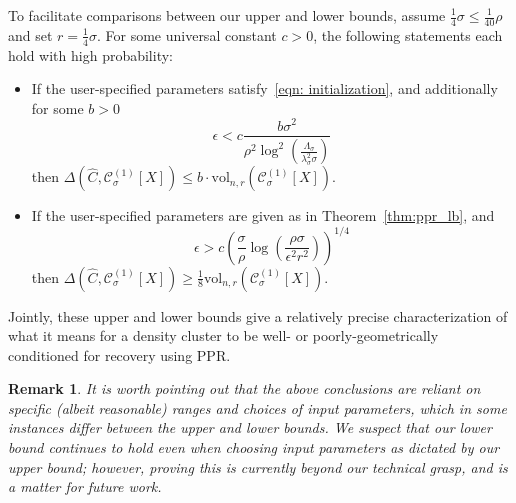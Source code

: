 \documentclass[11pt,twoside]{article}
\newtheorem*{remark}{Remark}
\newcommand{\vol}{\mathrm{vol}}
\newcommand{\1}{\mathbf{1}}
\newcommand{\Xbf}{X}             %
\newcommand{\Cset}{\mathcal{C}}
\newcommand{\Csig}{\Cset_{\sigma}}
\begin{document}
To facilitate comparisons between our upper and lower bounds, assume $\frac{1}{4}\sigma \leq \frac{1}{40}\rho$ and set $r = \frac{1}{4}\sigma$. 
For some universal constant $c > 0$, the following statements each hold with high probability:
\begin{itemize}
	\item If the user-specified parameters satisfy~\eqref{eqn: initialization}, and additionally for some $b > 0$
	\begin{equation*}
	\epsilon < c\frac{b\sigma^2}{\rho^2 \log^2\left(\frac{\Lambda_{\sigma}}{\lambda_{\sigma}^2\sigma}\right)}
	\end{equation*}
	then $\Delta(\widehat{C}, \Csig^{(1)}[\Xbf]) \leq b \cdot  \vol_{n,r}(\Csig^{(1)}[\Xbf])$.
	\item If the user-specified parameters are given as in Theorem~\ref{thm:ppr_lb}, and 
	\begin{equation*}
	\epsilon > c\left({\frac{\sigma}{\rho}} \log\left(\frac{\rho \sigma}{\epsilon^2 r^2}\right)\right)^{1/4}
	\end{equation*}
	then $\Delta(\widehat{C}, \Csig^{(1)}[\Xbf]) \geq \frac{1}{8} \vol_{n,r}(\Csig^{(1)}[\Xbf])$.
\end{itemize}

Jointly, these upper and lower bounds give a relatively precise characterization of what it means for a density cluster to be well- or poorly-geometrically conditioned for recovery using PPR.

\begin{remark}
	It is worth pointing out that the above conclusions are reliant on specific (albeit reasonable) ranges and choices of input parameters, which in some instances differ between the upper and lower bounds. We suspect that our lower bound continues to hold even when choosing input parameters as dictated by our upper bound; however, proving this is currently beyond our technical grasp, and is a matter for future work. 
\end{remark}
\end{document}
